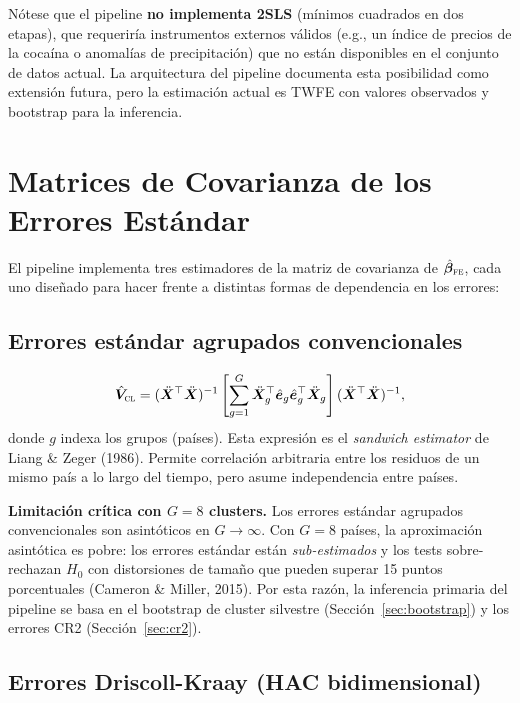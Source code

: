 \documentclass[12pt, a4paper]{article}
\theoremstyle{definition}
\begin{document}
Nótese que el pipeline \textbf{no implementa 2SLS} (mínimos cuadrados en dos etapas), que requeriría instrumentos externos válidos (e.g., un índice de precios de la cocaína o anomalías de precipitación) que no están disponibles en el conjunto de datos actual. La arquitectura del pipeline documenta esta posibilidad como extensión futura, pero la estimación actual es TWFE con valores observados y bootstrap para la inferencia.

\section{Matrices de Covarianza de los Errores Estándar}

El pipeline implementa tres estimadores de la matriz de covarianza de $\hat{\bm{\beta}}_{\textsc{fe}}$, cada uno diseñado para hacer frente a distintas formas de dependencia en los errores:

\subsection{Errores estándar agrupados convencionales}

\[
  \hat{\bm{V}}_{\textsc{cl}} = (\ddot{\bm{X}}^\top\ddot{\bm{X}})^{-1}
  \left[\sum_{g=1}^{G}\ddot{\bm{X}}_g^\top\hat{\bm{e}}_g\hat{\bm{e}}_g^\top\ddot{\bm{X}}_g\right]
  (\ddot{\bm{X}}^\top\ddot{\bm{X}})^{-1},
\]
donde $g$ indexa los grupos (países). Esta expresión es el \emph{sandwich estimator} de Liang \& Zeger (1986). Permite correlación arbitraria entre los residuos de un mismo país a lo largo del tiempo, pero asume independencia entre países.

\begin{warningbox}
\textbf{Limitación crítica con $G = 8$ clusters.} Los errores estándar agrupados convencionales son asintóticos en $G \to \infty$. Con $G = 8$ países, la aproximación asintótica es pobre: los errores estándar están \emph{sub-estimados} y los tests sobre-rechazan $H_0$ con distorsiones de tamaño que pueden superar 15 puntos porcentuales (Cameron \& Miller, 2015). Por esta razón, la inferencia primaria del pipeline se basa en el bootstrap de cluster silvestre (Sección~\ref{sec:bootstrap}) y los errores CR2 (Sección~\ref{sec:cr2}).
\end{warningbox}

\subsection{Errores Driscoll-Kraay (HAC bidimensional)}
\end{document}
